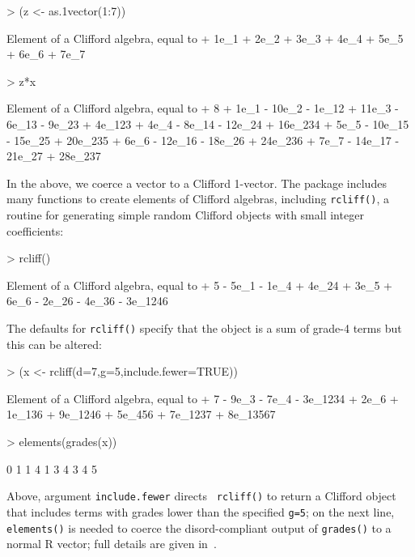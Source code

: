 \documentclass{birkjour}
\theoremstyle{definition}
\theoremstyle{remark}
\numberwithin{equation}{section}
\renewenvironment{Schunk}{\vspace{20pt}}{\vspace{20pt}}
\begin{document}
\begin{Schunk}
\begin{Sinput}
> (z <- as.1vector(1:7))
\end{Sinput}
\begin{Soutput}
Element of a Clifford algebra, equal to
+ 1e_1 + 2e_2 + 3e_3 + 4e_4 + 5e_5 + 6e_6 + 7e_7
\end{Soutput}
\begin{Sinput}
> z*x
\end{Sinput}
\begin{Soutput}
Element of a Clifford algebra, equal to
+ 8 + 1e_1 - 10e_2 - 1e_12 + 11e_3 - 6e_13 - 9e_23 + 4e_123 +
4e_4 - 8e_14 - 12e_24 + 16e_234 + 5e_5 - 10e_15 - 15e_25 + 20e_235 +
6e_6 - 12e_16 - 18e_26 + 24e_236 + 7e_7 - 14e_17 - 21e_27 + 28e_237
\end{Soutput}
\end{Schunk}
%
In the above, we coerce a vector to a Clifford 1-vector.  The package
includes many functions to create elements of Clifford algebras,
including {\tt rcliff()}, a routine for generating
simple random Clifford objects with small integer
  coefficients:

\begin{Schunk}
\begin{Sinput}
> rcliff()
\end{Sinput}
\begin{Soutput}
Element of a Clifford algebra, equal to
+ 5 - 5e_1 - 1e_4 + 4e_24 + 3e_5 + 6e_6 - 2e_26 - 4e_36 - 3e_1246
\end{Soutput}
\end{Schunk}
%
The defaults for {\tt rcliff()} specify that the object is a sum of
grade-4 terms but this can be altered:

\begin{Schunk}
\begin{Sinput}
> (x <- rcliff(d=7,g=5,include.fewer=TRUE))
\end{Sinput}
\begin{Soutput}
Element of a Clifford algebra, equal to
+ 7 - 9e_3 - 7e_4 - 3e_1234 + 2e_6 + 1e_136 + 9e_1246 + 5e_456
+ 7e_1237 + 8e_13567
\end{Soutput}
\begin{Sinput}
> elements(grades(x))
\end{Sinput}
\begin{Soutput}
 [1] 0 1 1 4 1 3 4 3 4 5
\end{Soutput}
\end{Schunk}
%
Above, argument {\tt include.fewer} directs {\tt
    rcliff()} to return a Clifford object that includes terms with
  grades lower than the specified {\tt g=5}; on the next line, {\tt
    elements()} is needed to coerce the disord-compliant output of
  {\tt grades()} to a normal R vector; full details are given
  in~\cite{hankin2022_disordR}.
\end{document}

